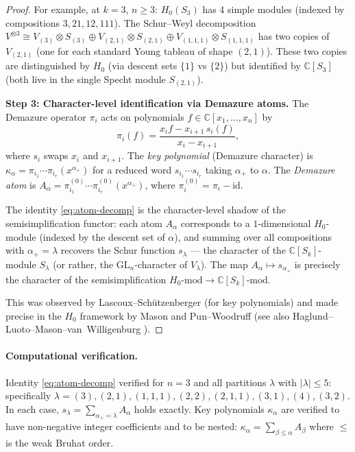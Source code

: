 \documentclass[11pt]{article}
\theoremstyle{remark}
\newcommand{\CC}{\mathbb{C}}
\newcommand{\GL}{\mathrm{GL}}
\newcommand{\id}{\mathrm{id}}
\newcommand{\Mod}{\text{-mod}}
\begin{document}
\begin{proof}
For example, at $k=3$, $n \ge 3$: $H_0(S_3)$ has 4 simple modules
(indexed by compositions $3, 21, 12, 111$). The Schur--Weyl decomposition
$V^{\otimes 3} \cong V_{(3)} \otimes S_{(3)} \oplus V_{(2,1)} \otimes S_{(2,1)}
\oplus V_{(1,1,1)} \otimes S_{(1,1,1)}$ has two copies of $V_{(2,1)}$
(one for each standard Young tableau of shape $(2,1)$). These two copies
are distinguished by $H_0$ (via descent sets $\{1\}$ vs $\{2\}$) but identified
by $\CC[S_3]$ (both live in the single Specht module $S_{(2,1)}$).

\textbf{Step 3: Character-level identification via Demazure atoms.}
The Demazure operator $\pi_i$ acts on polynomials $f \in \CC[x_1,\ldots,x_n]$ by
\[
  \pi_i(f) = \frac{x_i f - x_{i+1}\, s_i(f)}{x_i - x_{i+1}},
\]
where $s_i$ swaps $x_i$ and $x_{i+1}$.
The \emph{key polynomial} (Demazure character) is
$\kappa_\alpha = \pi_{i_1} \cdots \pi_{i_r}(x^{\alpha_+})$
for a reduced word $s_{i_1} \cdots s_{i_r}$ taking $\alpha_+$ to $\alpha$.
The \emph{Demazure atom} is
$A_\alpha = \pi_{i_1}^{(0)} \cdots \pi_{i_r}^{(0)}(x^{\alpha_+})$,
where $\pi_i^{(0)} = \pi_i - \id$.

The identity \eqref{eq:atom-decomp} is the character-level shadow of the
semisimplification functor: each atom $A_\alpha$ corresponds to a $1$-dimensional
$H_0$-module (indexed by the descent set of $\alpha$), and summing over all
compositions with $\alpha_+ = \lambda$ recovers the Schur function $s_\lambda$
--- the character of the $\CC[S_k]$-module $S_\lambda$ (or rather, the $\GL_n$-character
of $V_\lambda$). The map $A_\alpha \mapsto s_{\alpha_+}$ is precisely
the character of the semisimplification $H_0\Mod \to \CC[S_k]\Mod$.

This was observed by Lascoux--Sch\"utzenberger \cite{LS1990} (for key polynomials)
and made precise in the $H_0$ framework by Mason \cite{mason2009} and
Pun--Woodruff (see also Haglund--Luoto--Mason--van~Willigenburg \cite{HLMW2011}).
\end{proof}

\paragraph{Computational verification.}
Identity \eqref{eq:atom-decomp} verified for $n = 3$ and all partitions $\lambda$
with $|\lambda| \le 5$: specifically
$\lambda = (3), (2{,}1), (1{,}1{,}1), (2{,}2), (2{,}1{,}1), (3{,}1), (4), (3{,}2)$.
In each case, $s_\lambda = \sum_{\alpha_+ = \lambda} A_\alpha$ holds exactly.
Key polynomials $\kappa_\alpha$ are verified to have non-negative integer coefficients
and to be nested: $\kappa_\alpha = \sum_{\beta \le \alpha} A_\beta$ where $\le$ is the
weak Bruhat order.
\end{document}
